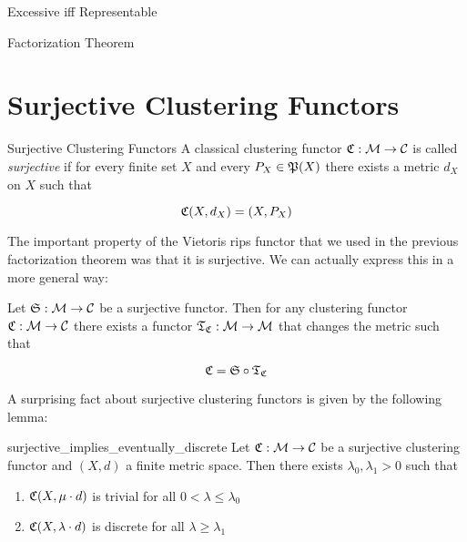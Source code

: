 \begin{theorem}{Excessive iff Representable}{}
\end{theorem}

\begin{theorem}{}{}
    Factorization Theorem
\end{theorem}

\section{Surjective Clustering Functors}

\begin{definition}{Surjective Clustering Functors}{}
    A classical clustering functor $\Cf: \M \to \C$ is called \emph{surjective} if for every finite set $X$ and every $P_X \in \P(X)$ there exists a metric $d_X$ on $X$ such that

    \begin{equation*}
        \Cf(X,d_X) = (X,P_X)
    \end{equation*}

\end{definition}

The important property of the Vietoris rips functor that we used in the previous factorization theorem was that it is surjective. We can actually express this in a more general way:

\begin{proposition}{}{}
    Let $\mathfrak{S}: \M \to \C$ be a surjective functor. Then for any clustering functor $\Cf: \M \to \C$ there exists a functor $\Tf_\Cf: \M \to \M$ that changes the metric such that

    \begin{equation*}
        \Cf = \mathfrak{S} \circ \Tf_\Cf
    \end{equation*}

    \newresult
\end{proposition}

A surprising fact about surjective clustering functors is given by the following lemma:

\begin{lemma}{}{surjective_implies_eventually_discrete}
    Let $\Cf: \M \to \C$ be a surjective clustering functor and $(X,d)$ a finite metric space. Then there exists $\lambda_0,\lambda_1 > 0$ such that
    \begin{enumerate}
        \item $\Cf(X,\mu \cdot d)$ is trivial for all $0 < \lambda \le \lambda_0$
        \item $\Cf(X,\lambda \cdot d)$ is discrete for all $\lambda \ge \lambda_1$
    \end{enumerate}

    \newresult
\end{lemma}

